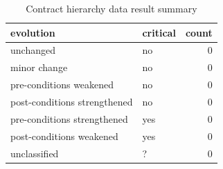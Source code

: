 \begin{table}[]
\centering
\caption{Contract hierarchy data result summary}
\label{tab:results-hierarchy}
\begin{tabular}{|l|l|r|} \hline
   evolution & critical & count \\ \hline
   unchanged & no & 0  \\
   minor change & no & 0  \\
   pre-conditions weakened & no & 0  \\
   post-conditions strengthened & no & 0  \\ \hline
   pre-conditions strengthened & yes & 0  \\
   post-conditions weakened & yes & 0  \\ \hline
   unclassified & ? & 0  \\ \hline
\end{tabular}
\end{table}
